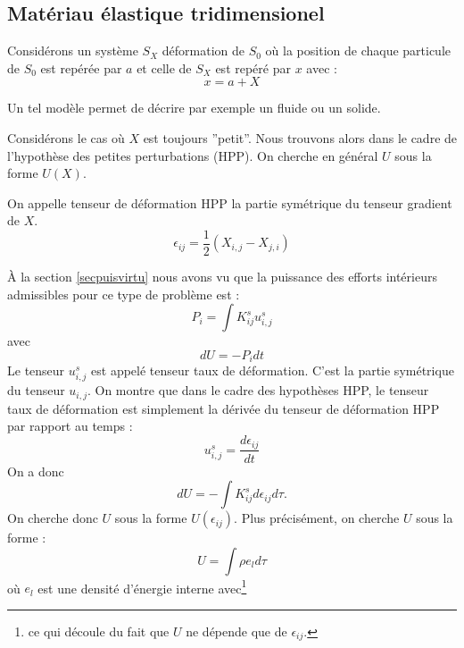 \documentclass[12pt]{book}
\begin{document}
\subsection{Mat\'eriau \'elastique tridimensionel}\label{secmaterelast}
Consid\'erons un syst\`eme $S_X$ d\'eformation de $S_0$ o\`u la
position de 
chaque particule de $S_0$ est rep\'er\'ee par $a$ et celle de $S_X$ est
rep\'er\'e par $x$ avec :
\begin{equation}
x=a+X
\end{equation}
\begin{rem}
Un tel mod\`ele permet de d\'ecrire par exemple un fluide ou un solide.
\end{rem}
Consid\'erons le cas o\`u $X$ est toujours ''petit''. Nous trouvons
alors dans le cadre de 
l'hypoth\`ese des petites perturbations (HPP).
On cherche en g\'en\'eral $U$ sous la forme 
 $U(X)$.
\begin{defn}
On appelle tenseur de d\'eformation HPP la partie sym\'etrique du tenseur
gradient de $X$.
\begin{equation}
\epsilon_{ij}=\frac{1}{2}(X_{i,j}-X_{j,i})
\end{equation}
\end{defn}
\`A la section \ref{secpuisvirtu} nous avons vu que la puissance des
efforts int\'erieurs  admissibles pour ce type de probl\`eme est :
\begin{equation}
P_i=\int K_{ij}^s u_{i,j}^s
\end{equation}
avec
\begin{equation}
dU=-P_idt
\end{equation}
Le tenseur $u_{i,j}^s$ est appel\'e tenseur taux de d\'eformation.
C'est la partie sym\'etrique du tenseur $u_{i,j}$. On montre
\cite{ph:fluid:Germain80} que dans le cadre des hypoth\`eses HPP, le tenseur taux
de d\'eformation est 
simplement la d\'eriv\'ee du tenseur de d\'eformation HPP par rapport au temps
:
\begin{equation}
u_{i,j}^s=\frac{d\epsilon_{ij}}{dt}
\end{equation}
On a donc 
\begin{equation}\label{dukij}
dU=-\int K_{ij}^s d\epsilon_{ij}d\tau.
\end{equation}
On cherche donc $U$ sous la forme $U(\epsilon_{ij})$.
Plus pr\'ecis\'ement, on cherche $U$ sous la forme :
\begin{equation}
U=\int \rho e_l d\tau
\end{equation}
o\`u $e_l$ est une densit\'e d'\'energie interne avec\footnote{%
ce qui d\'ecoule du fait que  $U$ ne d\'epende que de
$\epsilon_{ij}$.} %
\end{document}
